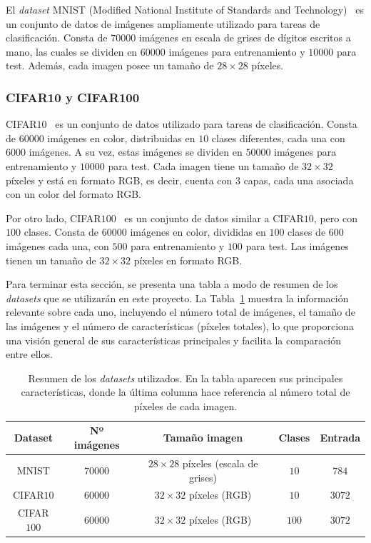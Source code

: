 El \textit{dataset} MNIST (Modified National Institute of Standards and Technology)~\cite{LeCun1998} es un conjunto de datos de imágenes ampliamente utilizado para tareas de clasificación. Consta de $70000$ imágenes en escala de grises de dígitos escritos a mano, las cuales se dividen en $60000$ imágenes para entrenamiento y $10000$ para test. Además, cada imagen posee un tamaño de $28 \times 28$ píxeles.

\subsubsection{CIFAR10 y CIFAR100}\label{subsubsec:CIFAR10-y-CIFAR100}

CIFAR$10$~\cite{Krizhevsky2009} es un conjunto de datos utilizado para tareas de clasificación. Consta de $60000$ imágenes en color, distribuidas en $10$ clases diferentes, cada una con $6000$ imágenes. A su vez, estas imágenes se dividen en $50000$ imágenes para entrenamiento y $10000$ para test. Cada imagen tiene un tamaño de $32 \times 32$ píxeles y está en formato RGB, es decir, cuenta con $3$ capas, cada una asociada con un color del formato RGB.

Por otro lado, CIFAR$100$~\cite{Krizhevsky2009} es un conjunto de datos similar a CIFAR$10$, pero con $100$ clases. Consta de $60000$ imágenes en color, divididas en $100$ clases de $600$ imágenes cada una, con $500$ para entrenamiento y $100$ para test. Las imágenes tienen un tamaño de $32 \times 32$ píxeles en formato RGB.

Para terminar esta sección, se presenta una tabla a modo de resumen de los \textit{datasets} que se utilizarán en este proyecto. La Tabla~\ref{tab:datasets} muestra la información relevante sobre cada uno, incluyendo el número total de imágenes, el tamaño de las imágenes y el número de características (píxeles totales), lo que proporciona una visión general de sus características principales y facilita la comparación entre ellos.

\begin{table}[h]
    \centering
    \begin{tabular}{|c|c|c|c|c|}
    \hline
    \textbf{Dataset} & \textbf{Nº imágenes} & \textbf{Tamaño imagen} & \textbf{Clases} & \textbf{Entrada} \\
    \hline
    MNIST & $70000$ & $28 \times 28$ píxeles (escala de grises) & $10$ & $784$ \\
    CIFAR$10$ & $60000$ & $32 \times 32$ píxeles (RGB) & $10$ & $3072$ \\
    CIFAR$100$ & $60000$ & $32 \times 32$ píxeles (RGB) & $100$ & $3072$ \\
    \hline
    \end{tabular}
    \caption[Resumen de los \textit{datasets} utilizados.]{Resumen de los \textit{datasets} utilizados. En la tabla aparecen sus principales características, donde la última columna hace referencia al número total de píxeles de cada imagen.}\label{tab:datasets}
\end{table}

